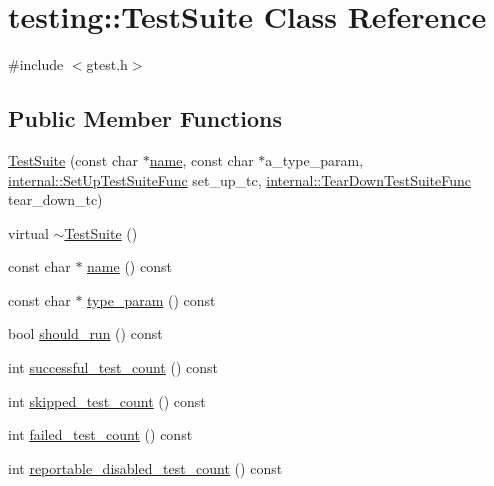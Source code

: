 \hypertarget{classtesting_1_1_test_suite}{}\section{testing\+::Test\+Suite Class Reference}
\label{classtesting_1_1_test_suite}


{\ttfamily \#include $<$gtest.\+h$>$}

\subsection*{Public Member Functions}
\begin{DoxyCompactItemize}
\item 
\mbox{\hyperlink{classtesting_1_1_test_suite_a2d6469bcb83701e1bbfe47c465e9731f}{Test\+Suite}} (const char $\ast$\mbox{\hyperlink{classtesting_1_1_test_suite_ab3369db678ca3d9648d6fd63ad038986}{name}}, const char $\ast$a\+\_\+type\+\_\+param, \mbox{\hyperlink{namespacetesting_1_1internal_a028e9455ad22171feabf84fe46329c92}{internal\+::\+Set\+Up\+Test\+Suite\+Func}} set\+\_\+up\+\_\+tc, \mbox{\hyperlink{namespacetesting_1_1internal_ab58aba5acd47d329b72a1d10c7b61648}{internal\+::\+Tear\+Down\+Test\+Suite\+Func}} tear\+\_\+down\+\_\+tc)
\item 
virtual \mbox{\hyperlink{classtesting_1_1_test_suite_a5e884630add3c01712a3e63bef543c60}{$\sim$\+Test\+Suite}} ()
\item 
const char $\ast$ \mbox{\hyperlink{classtesting_1_1_test_suite_ab3369db678ca3d9648d6fd63ad038986}{name}} () const
\item 
const char $\ast$ \mbox{\hyperlink{classtesting_1_1_test_suite_ab2ea12318bdbfb6aa97792344b49e3db}{type\+\_\+param}} () const
\item 
bool \mbox{\hyperlink{classtesting_1_1_test_suite_a8f62c17baef80042e0ff03ef5d5e4ba7}{should\+\_\+run}} () const
\item 
int \mbox{\hyperlink{classtesting_1_1_test_suite_a85bc4191681df7e8bae810c1744465ec}{successful\+\_\+test\+\_\+count}} () const
\item 
int \mbox{\hyperlink{classtesting_1_1_test_suite_ae48c72ff92fa1c555e3b577f8661285c}{skipped\+\_\+test\+\_\+count}} () const
\item 
int \mbox{\hyperlink{classtesting_1_1_test_suite_aaf18223e67cf0761f56bd4b8167abc6c}{failed\+\_\+test\+\_\+count}} () const
\item 
int \mbox{\hyperlink{classtesting_1_1_test_suite_ab0b3d1ee8efaa18ceb2553a71002c678}{reportable\+\_\+disabled\+\_\+test\+\_\+count}} () const

\end{DoxyCompactItemize}
